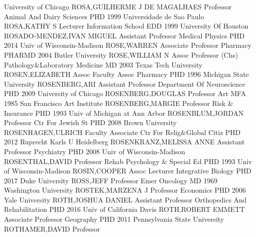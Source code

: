 \documentclass[
]{article}
\begin{document}
University of Chicago \textbar ROSA,GUILHERME J DE MAGALHAES
\textbar Professor \textbar{}  \textbar Animal And Dairy
Sciences \textbar PHD 1999 Universidade de Sao Paulo \textbar ROSA,KATHY
S \textbar Lecturer \textbar{}  \textbar Information School
\textbar EDD 1999 University Of Houston \textbar ROSADO-MENDEZ,IVAN
MIGUEL \textbar Assistant Professor \textbar{} 
\textbar Medical Physics \textbar PHD 2014 Univ of Wisconsin-Madison
\textbar ROSE,WARREN \textbar Associate Professor \textbar{}
 \textbar Pharmacy \textbar PHARMD 2004 Butler University
\textbar ROSE,WILLIAM N \textbar Assoc Professor (Chs) \textbar{}
 \textbar Pathology\&Laboratory Medicine \textbar MD 2003
Texas Tech University \textbar ROSEN,ELIZABETH \textbar Assoc Faculty
Assoc \textbar{}  \textbar Pharmacy \textbar PHD 1996
Michigan State University \textbar ROSENBERG,ARI \textbar Assistant
Professor \textbar{}  \textbar Department Of Neuroscience
\textbar PHD 2009 University of Chicago \textbar ROSENBERG,DOUGLAS
\textbar Professor \textbar{}  \textbar Art \textbar MFA
1985 San Francisco Art Institute \textbar ROSENBERG,MARGIE
\textbar Professor \textbar{}  \textbar Risk \& Insurance
\textbar PHD 1993 Univ of Michigan at Ann Arbor
\textbar ROSENBLUM,JORDAN \textbar Professor \textbar{} 
\textbar Ctr For Jewish St \textbar PHD 2008 Brown University
\textbar ROSENHAGEN,ULRICH \textbar Faculty Associate \textbar{}
 \textbar Ctr For Relig\&Global Citiz \textbar PHD 2012
Ruprecht Karls U Heidelberg \textbar ROSENKRANZ,MELISSA ANNE
\textbar Assistant Professor \textbar{}  \textbar Psychiatry
\textbar PHD 2008 Univ of Wisconsin-Madison \textbar ROSENTHAL,DAVID
\textbar Professor \textbar{}  \textbar Rehab Psychology \&
Special Ed \textbar PHD 1993 Univ of Wisconsin-Madison
\textbar ROSIN,COOPER \textbar Assoc Lecturer \textbar{} 
\textbar Integrative Biology \textbar PHD 2017 Duke University
\textbar ROSS,JEFF \textbar Professor Emer \textbar{} 
\textbar Oncology \textbar MD 1969 Washington University
\textbar ROSTEK,MARZENA J \textbar Professor \textbar{} 
\textbar Economics \textbar PHD 2006 Yale University
\textbar ROTH,JOSHUA DANIEL \textbar Assistant Professor \textbar{}
 \textbar Orthopedics And Rehabilitation \textbar PHD 2016
Univ of California Davis \textbar ROTH,ROBERT EMMETT \textbar Associate
Professor \textbar{}  \textbar Geography \textbar PHD 2011
Pennsylvania State University \textbar ROTHAMER,DAVID \textbar Professor
\end{document}
